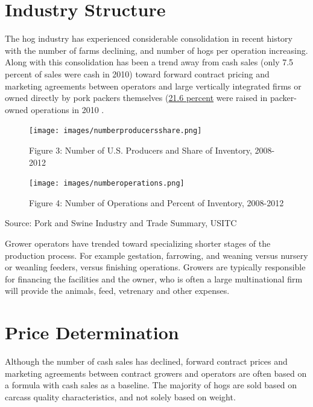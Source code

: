 \documentclass[
]{book}
\begin{document}
\hypertarget{industry-structure}{%
\section{Industry Structure}\label{industry-structure}}

The hog industry has experienced considerable consolidation in recent history with the number of farms declining, and number of hogs per operation increasing. Along with this consolidation has been a trend away from cash sales (only 7.5 percent of sales were cash in 2010) toward forward contract pricing and marketing agreements between operators and large vertically integrated firms or owned directly by pork packers themselves (\href{pdf-readings/gipsa10.pdf}{21.6 percent} were raised in packer-owned operations in 2010 \citep{gipsa10}.

\begin{figure}
\centering
\texttt{[image: images/numberproducersshare.png]}
\caption{Figure 3: Number of U.S. Producers and Share of Inventory, 2008-2012}
\end{figure}

\begin{figure}
\centering
\texttt{[image: images/numberoperations.png]}
\caption{Figure 4: Number of Operations and Percent of Inventory, 2008-2012}
\end{figure}

Source: Pork and Swine Industry and Trade Summary, USITC

Grower operators have trended toward specializing shorter stages of the production process. For example gestation, farrowing, and weaning versus nursery or weanling feeders, versus finishing operations. Growers are typically responsible for financing the facilities and the owner, who is often a large multinational firm will provide the animals, feed, vetrenary and other expenses.

\hypertarget{price-determination}{%
\section{Price Determination}\label{price-determination}}

Although the number of cash sales has declined, forward contract prices and marketing agreements between contract growers and operators are often based on a formula with cash sales as a baseline. The majority of hogs are sold based on carcass quality characteristics, and not solely based on weight.
\end{document}
